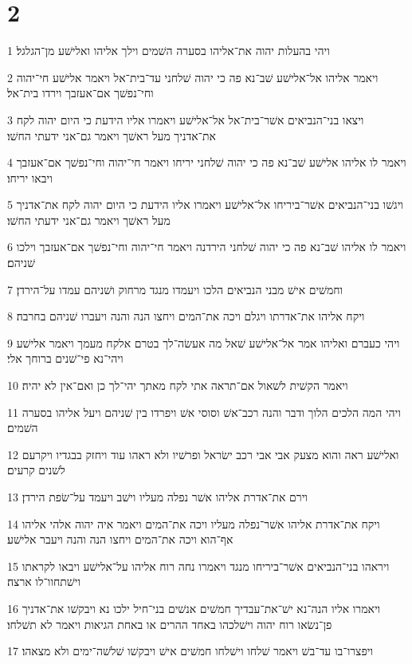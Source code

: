\chapter{2}

\par 1 ויהי בהעלות יהוה את־אליהו בסערה השׁמים וילך אליהו ואלישׁע מן־הגלגל׃
\par 2 ויאמר אליהו אל־אלישׁע שׁב־נא פה כי יהוה שׁלחני עד־בית־אל ויאמר אלישׁע חי־יהוה וחי־נפשׁך אם־אעזבך וירדו בית־אל׃
\par 3 ויצאו בני־הנביאים אשׁר־בית־אל אל־אלישׁע ויאמרו אליו הידעת כי היום יהוה לקח את־אדניך מעל ראשׁך ויאמר גם־אני ידעתי החשׁו׃
\par 4 ויאמר לו אליהו אלישׁע שׁב־נא פה כי יהוה שׁלחני יריחו ויאמר חי־יהוה וחי־נפשׁך אם־אעזבך ויבאו יריחו׃
\par 5 ויגשׁו בני־הנביאים אשׁר־ביריחו אל־אלישׁע ויאמרו אליו הידעת כי היום יהוה לקח את־אדניך מעל ראשׁך ויאמר גם־אני ידעתי החשׁו׃
\par 6 ויאמר לו אליהו שׁב־נא פה כי יהוה שׁלחני הירדנה ויאמר חי־יהוה וחי־נפשׁך אם־אעזבך וילכו שׁניהם׃
\par 7 וחמשׁים אישׁ מבני הנביאים הלכו ויעמדו מנגד מרחוק ושׁניהם עמדו על־הירדן׃
\par 8 ויקח אליהו את־אדרתו ויגלם ויכה את־המים ויחצו הנה והנה ויעברו שׁניהם בחרבה׃
\par 9 ויהי כעברם ואליהו אמר אל־אלישׁע שׁאל מה אעשׂה־לך בטרם אלקח מעמך ויאמר אלישׁע ויהי־נא פי־שׁנים ברוחך אלי׃
\par 10 ויאמר הקשׁית לשׁאול אם־תראה אתי לקח מאתך יהי־לך כן ואם־אין לא יהיה׃
\par 11 ויהי המה הלכים הלוך ודבר והנה רכב־אשׁ וסוסי אשׁ ויפרדו בין שׁניהם ויעל אליהו בסערה השׁמים׃
\par 12 ואלישׁע ראה והוא מצעק אבי אבי רכב ישׂראל ופרשׁיו ולא ראהו עוד ויחזק בבגדיו ויקרעם לשׁנים קרעים׃
\par 13 וירם את־אדרת אליהו אשׁר נפלה מעליו וישׁב ויעמד על־שׂפת הירדן׃
\par 14 ויקח את־אדרת אליהו אשׁר־נפלה מעליו ויכה את־המים ויאמר איה יהוה אלהי אליהו אף־הוא ויכה את־המים ויחצו הנה והנה ויעבר אלישׁע׃
\par 15 ויראהו בני־הנביאים אשׁר־ביריחו מנגד ויאמרו נחה רוח אליהו על־אלישׁע ויבאו לקראתו וישׁתחוו־לו ארצה׃
\par 16 ויאמרו אליו הנה־נא ישׁ־את־עבדיך חמשׁים אנשׁים בני־חיל ילכו נא ויבקשׁו את־אדניך פן־נשׂאו רוח יהוה וישׁלכהו באחד ההרים או באחת הגיאות ויאמר לא תשׁלחו׃
\par 17 ויפצרו־בו עד־בשׁ ויאמר שׁלחו וישׁלחו חמשׁים אישׁ ויבקשׁו שׁלשׁה־ימים ולא מצאהו׃
